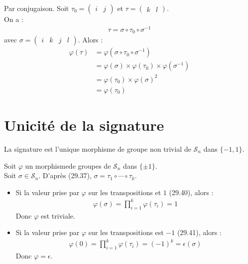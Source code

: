 \documentclass[../main.tex]{subfiles}
\begin{document}
Par conjugaison. Soit $\tau_0 = \begin{pmatrix}
    i & j
\end{pmatrix}$ et $\tau = \begin{pmatrix}
    k & l
\end{pmatrix}$. \\
On a : 
\begin{align*}
    \tau = \sigma \circ \tau_0 \circ \sigma^{-1}
\end{align*}
avec $\sigma = \begin{pmatrix}
    i & k & j & l
\end{pmatrix}$. Alors : 
\begin{align*}
    \varphi(\tau) &= \varphi(\sigma \circ \tau_0 \circ \sigma^{-1}) \\
    &= \varphi(\sigma) \times \varphi(\tau_0) \times \varphi(\sigma^{-1}) \\
    &= \varphi(\tau_0) \times \varphi(\sigma)^2 \\
    &= \varphi(\tau_0)
\end{align*}

\section{Unicité de la signature}
\begin{tcolorbox}[title=Théorème 29.42, title filled=false, colframe=orange, colback=orange!10!white]
    La signature est l'unique morphisme de groupe non trivial de $\mathcal{S}_n$ dans $\{-1, 1\}$. 
\end{tcolorbox}

Soit $\varphi$ un morphismede groupes de $\mathcal{S}_n$ dans $\{\pm 1\}$. \\
Soit $\sigma\in \mathcal{S}_n$. D'après (29.37), $\sigma = \tau_1\circ \cdots \circ \tau_k$. 
\begin{itemize}
    \item Si la valeur prise par $\varphi$ sur les transpositions et $1$ (29.40), alors : 
    \begin{align*}
        \varphi(\sigma) = \prod_{i=1}^{k} \varphi(\tau_i) = 1
    \end{align*}
    Donc $\varphi$ est triviale. 

    \item Si la valeur prise par $\varphi$ sur les transpositions est $-1$ (29.41), alors :
    \begin{align*}
        \varphi(0) = \prod_{i=1}^{k} \varphi(\tau_i) = (-1)^k = \epsilon(\sigma)
    \end{align*}
    Donc $\varphi = \epsilon$.
\end{itemize}
\end{document}
